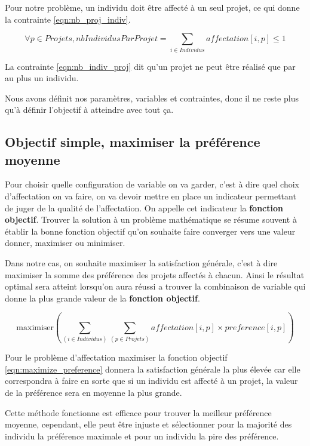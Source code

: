 \documentclass[final,poster]{polytech/polytech}
\begin{document}
Pour notre problème, un individu doit être affecté à un seul projet, ce qui donne la contrainte \eqref{eqn:nb_proj_indiv}.

\begin{equation}
\label{eqn:nb_indiv_proj}
\forall p \in Projets, nbIndividusParProjet= \sum_{i \in Individus} affectation[i,p] \leqslant 1
\end{equation}

La contrainte \eqref{eqn:nb_indiv_proj} dit qu'un projet ne peut être réalisé que par au plus un individu.

Nous avons définit nos paramètres, variables et contraintes, donc il ne reste plus qu'à définir l'objectif à atteindre avec tout ça.
\subsection{Objectif simple, maximiser la préférence moyenne}
\label{sec:max_pref_moy}

Pour choisir quelle configuration de variable on va garder, c'est à dire quel choix d'affectation on va faire, on va devoir mettre en place un indicateur permettant de juger de la qualité de l'affectation.
On appelle cet indicateur la \textbf{fonction objectif}.
Trouver la solution à un problème mathématique se résume souvent à établir la bonne fonction objectif qu'on souhaite faire converger vers une valeur donner, maximiser ou minimiser.


Dans notre cas, on souhaite maximiser la satisfaction générale, c'est à dire maximiser la somme des préférence des projets affectés à chacun. Ainsi le résultat optimal sera atteint lorsqu'on aura réussi a trouver la combinaison de variable qui donne la plus grande valeur de la \textbf{fonction objectif}.

\begin{equation}
\label{eqn:maximize_preference}
\text{maximiser} \left( \sum_{(i \in Individus)} \sum_{(p\in Projets)} affectation[i,p]\times preference[i,p] \right)
\end{equation}

Pour le problème d'affectation maximiser la fonction objectif \eqref{eqn:maximize_preference} donnera la satisfaction générale la plus élevée car elle correspondra à faire en sorte que si un individu est affecté à un projet, la valeur de la préférence sera en moyenne la plus grande.

Cette méthode fonctionne est efficace pour trouver la meilleur préférence moyenne, cependant, elle peut être injuste et sélectionner pour la majorité des individu la préférence maximale et pour un individu la pire des préférence.
\end{document}
